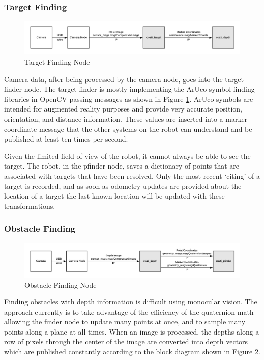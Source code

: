 \documentclass{article}[12]
\begin{document}
	\subsubsection{Target Finding}
	
	\begin{figure}[H]
		\centering
		\includegraphics[width=0.9\linewidth]{TargetDiagram.png}
		\caption{Target Finding Node}
		\label{fig:target}
	\end{figure}

	Camera data, after being processed by the camera node, goes into the target finder node. The target finder is mostly implementing the ArUco symbol finding libraries in OpenCV passing messages as shown in Figure \ref{fig:target}. ArUco symbols are intended for augmented reality purposes and provide very accurate position, orientation, and distance information. These values are inserted into a marker coordinate message that the other systems on the robot can understand and be published at least ten times per second.
	
	Given the limited field of view of the robot, it cannot always be able to see the target. The robot, in the pfinder node, saves a dictionary of points that are associated with targets that have been resolved. Only the most recent `citing' of a target is recorded, and as soon as odometry updates are provided about the location of a target the last known location will be updated with these transformations.
	
	\subsubsection{Obstacle Finding}
	
	\begin{figure}[H]
		\centering
		\includegraphics[width=0.9\linewidth]{DepthDiagram.png}
		\caption{Obstacle Finding Node}
		\label{fig:obstacle}
	\end{figure}

	Finding obstacles with depth information is difficult using monocular vision. The approach currently is to take advantage of the efficiency of the quaternion math allowing the finder node to update many points at once, and to sample many points along a plane at all times. When an image is processed, the depths along a row of pixels through the center of the image are converted into depth vectors which are published constantly according to the block diagram shown in Figure \ref{fig:obstacle}. 
	
\end{document}
